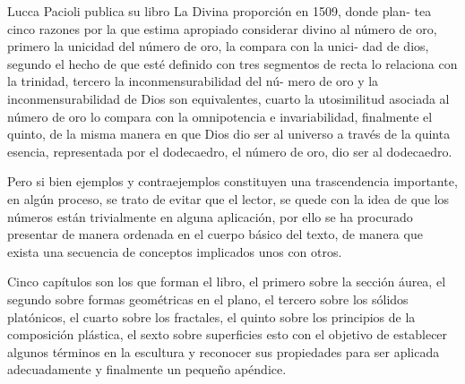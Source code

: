 \documentclass[a4paper]{book}
\begin{document}
  Lucca Pacioli publica su libro La Divina proporción en 1509, donde plan-
  tea cinco razones por la que estima apropiado considerar divino al número
  de oro, primero la unicidad del número de oro, la compara con la unici-
  dad de dios, segundo el hecho de que esté definido con tres segmentos de
  recta lo relaciona con la trinidad, tercero la inconmensurabilidad del nú-
  mero de oro y la inconmensurabilidad de Dios son equivalentes, cuarto la
  utosimilitud asociada al número de oro lo compara con la omnipotencia e
  invariabilidad, finalmente el quinto, de la misma manera en que Dios dio ser
  al universo a través de la quinta esencia, representada por el dodecaedro,
  el número de oro, dio ser al dodecaedro.

  Pero si bien ejemplos y contraejemplos constituyen una trascendencia
  importante, en algún proceso, se trato de evitar que el lector, se quede con
  la idea de que los números están trivialmente en alguna aplicación, por
  ello se ha procurado presentar de manera ordenada en el cuerpo básico del
  texto, de manera que exista una secuencia de conceptos implicados unos
  con otros.

  Cinco capítulos son los que forman el libro, el primero sobre la sección
  áurea, el segundo sobre formas geométricas en el plano, el tercero sobre los
  sólidos platónicos, el cuarto sobre los fractales, el quinto sobre los principios
  de la composición plástica, el sexto sobre superficies esto con el objetivo de
  establecer algunos términos en la escultura y reconocer sus propiedades
  para ser aplicada adecuadamente y finalmente un pequeño apéndice.



  
  
  
  
  
  
  




  
  
  \printindex



  \appendix
  \setcounter{page}{1}
  
\end{document}
